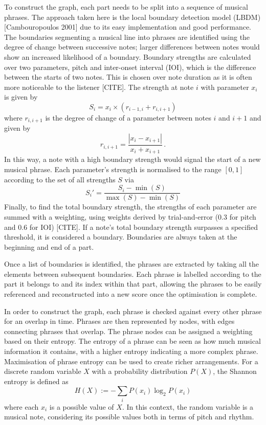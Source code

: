 \documentclass[aps,pra,10pt,twocolumn]{revtex4-2}
\begin{document}
To construct the graph, each part needs to be split into a sequence of musical phrases. The approach taken here is the local boundary detection model (LBDM) [Cambouropoulos 2001] due to its easy implementation and good performance. The boundaries segmenting a musical line into phrases are identified using the degree of change between successive notes; larger differences between notes would show an increased likelihood of a boundary. Boundary strengths are calculated over two parameters, pitch and inter-onset interval (IOI), which is the difference between the starts of two notes. This is chosen over note duration as it is often more noticeable to the listener [CITE]. The strength at note $i$ with parameter $x_i$ is given by
\begin{equation}
    S_i=x_i\times (r_{i-1, i} + r_{i, i+1})
    \label{eq:boundary-strength}
\end{equation}
where $r_{i, i+1}$ is the degree of change of a parameter between notes $i$ and $i+1$ and given by
\begin{equation}
    r_{i, i+1}=\frac{|x_{i}-x_{i+1}|}{x_{i}+x_{i+1}} \,.
    \label{eq:degree-change}
\end{equation}
In this way, a note with a high boundary strength would signal the start of a new musical phrase. Each parameter's strength is normalised to the range $[0,1]$ according to the set of all strengths $S$ via
\begin{equation}
    S_i'=\frac{S_i-\min(S)}{\max(S)-\min(S)}
    \label{eq:normalisation}
\end{equation}
Finally, to find the total boundary strength, the strengths of each parameter are summed with a weighting, using weights derived by trial-and-error ($0.3$ for pitch and $0.6$ for IOI) [CITE]. If a note's total boundary strength surpasses a specified threshold, it is considered a boundary. Boundaries are always taken at the beginning and end of a part.

Once a list of boundaries is identified, the phrases are extracted by taking all the elements between subsequent boundaries. Each phrase is labelled according to the part it belongs to and its index within that part, allowing the phrases to be easily referenced and reconstructed into a new score once the optimisation is complete.

In order to construct the graph, each phrase is checked against every other phrase for an overlap in time. Phrases are then represented by nodes, with edges connecting phrases that overlap. The phrase nodes can be assigned a weighting based on their entropy. The entropy of a phrase can be seen as how much musical information it contains, with a higher entropy indicating a more complex phrase. Maximisation of phrase entropy can be used to create richer arrangements. For a discrete random variable $X$ with a probability distribution $P(X)$, the Shannon entropy is defined as
\begin{equation}
    H(X):=-\sum_i P(x_i)\log_2 P(x_i)
    \label{eq:entropy}
\end{equation}
where each $x_i$ is a possible value of $X$. In this context, the random variable is a musical note, considering its possible values both in terms of pitch and rhythm.
\end{document}
